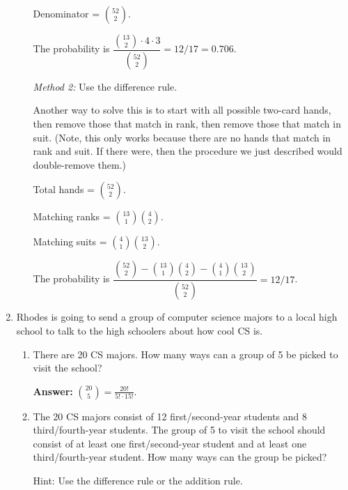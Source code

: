 \documentclass[11pt, letterpaper]{report}
\begin{document}
\begin{enumerate}
\begin{enumerate}
        Denominator = $\binom{52}{2}$.
        
        The probability is $\dfrac{\displaystyle \binom{13}{2}\cdot 4 \cdot 3}{\displaystyle \binom{52}{2}} = 12/17 = 0.706.$
        
        \emph{Method 2:} Use the difference rule.
        
        Another way to solve this is to start with all possible two-card hands, then remove
        those that match in rank, then remove those that match in suit.  (Note, this only works
        because there are no hands that match in rank and suit.  If there were, then the 
        procedure we just described would double-remove them.)
        
        Total hands = $\binom{52}{2}$.
        
        Matching ranks = $\binom{13}{1}\binom{4}{2}$.
        
        Matching suits = $\binom{4}{1}\binom{13}{2}$.
        
        The probability is $\dfrac{\binom{52}{2} - \binom{13}{1}\binom{4}{2} - \binom{4}{1}\binom{13}{2}}{\binom{52}{2}} = 12/17$.
        
        
        \end{enumerate}
	




\item Rhodes is going to send a group of computer science majors to a local high school
to talk to the high schoolers about how cool CS is.  
\begin{enumerate}
        \item There are 20 CS majors.  How many ways can a group of 5 be picked to visit the 
        school?
        
           \textbf{Answer:} $\displaystyle \binom{20}{5} = \frac{20!}{5! \cdot 15!}$.

     
        
        \item The 20 CS majors consist of 12 first/second-year students and 8 third/fourth-year students.
        The group of 5 to visit the school should consist of at least one first/second-year student
        and at least one third/fourth-year student.  How many ways can the group be picked?
        
        Hint: Use the difference rule or the addition rule.
        

\end{enumerate}
\end{enumerate}
\end{document}
